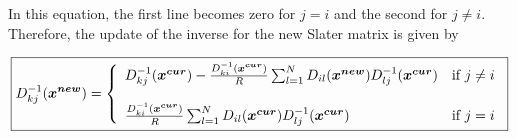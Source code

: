 In this equation, the first line becomes zero for $j=i$ and the second for $j \neq i$. Therefore, the update of the inverse for the new Slater matrix is given by

\begin{eqnarray}
\boxed{D^{-1}_{kj}(\boldsymbol{x^{new}})  = \left\{ 
\begin{array}{l l}
  D^{-1}_{kj}(\boldsymbol{x^{cur}}) - \frac{D^{-1}_{ki}(\boldsymbol{x^{cur}})}{R} \sum_{l=1}^{N} D_{il}(\boldsymbol{x^{new}})  D^{-1}_{lj}(\boldsymbol{x^{cur}}) & \mbox{if $j \neq i$}\nonumber \\ \\
 \frac{D^{-1}_{ki}(\boldsymbol{x^{cur}})}{R} \sum_{l=1}^{N} D_{il}(\boldsymbol{x^{cur}}) D^{-1}_{lj}(\boldsymbol{x^{cur}}) & \mbox{if $j=i$}
\end{array} \right.}
\end{eqnarray}

\clearemptydoublepage
